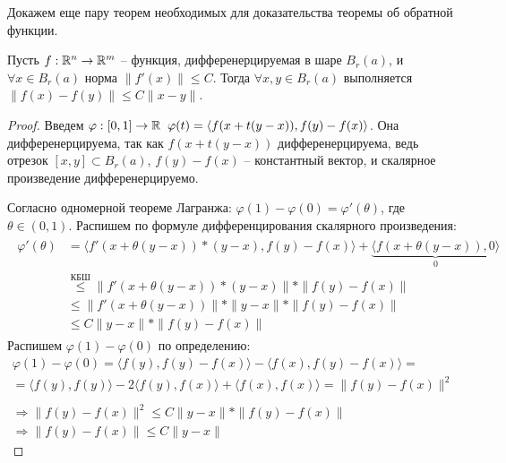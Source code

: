 Докажем еще пару теорем необходимых для доказательства теоремы об обратной функции.
\begin{theorem}
    Пусть $f: \mathbb{R}^n \to \mathbb{R}^m$ -- функция, дифференерцируемая в шаре $B_r(a)$, и $\forall x \in B_r(a)$ норма $\| f'(x) \| \leqslant C$. 
    Тогда $\forall x, y \in B_r(a)$ выполняется $\| f(x) - f(y) \| \leqslant C \| x - y \|$.
\end{theorem}
\begin{proof}
    Введем $\varphi:[0, 1] \to \mathbb{R} \;\; \varphi(t) = \langle f(x + t(y - x)), f(y) - f(x) \rangle$.
    Она дифференерцируема, так как $f(x + t(y - x))$ дифференерцируема, ведь отрезок $[x, y] \subset B_r(a)$, $f(y) - f(x)$ -- константный вектор, и скалярное произведение дифференерцируемо.

    \quad Согласно одномерной теореме Лагранжа: $\varphi(1) - \varphi(0) = \varphi'(\theta)$, где $\theta \in (0, 1)$. 
    Распишем по формуле дифференцирования скалярного произведения: \begin{gather*}
        \begin{split}
            \varphi'(\theta) &= \langle f'(x + \theta(y - x))*(y - x), f(y) - f(x) \rangle + \underbrace{\langle f(x + \theta(y - x)), 0 \rangle}_0  \\
            &\overset{\text{КБШ}}{\leqslant} \| f'(x + \theta(y - x))*(y - x) \| * \| f(y) - f(x) \| \\
            &\leqslant \| f'(x + \theta(y - x))\| * \| y - x \| * \| f(y) - f(x) \| \\
            &\leqslant C\| y - x \| * \| f(y) - f(x) \|
        \end{split}
    \end{gather*}
    \quad Распишем $\varphi(1) - \varphi(0)$ по определению: \begin{gather*}
        \varphi(1) - \varphi(0) = \langle f(y), f(y) - f(x) \rangle - \langle f(x), f(y) - f(x) \rangle = \\
        = \langle f(y), f(y) \rangle - 2 \langle f(y), f(x) \rangle +  \langle f(x), f(x) \rangle = \| f(y) - f(x) \|^2 \\ \\
        \Rightarrow \| f(y) - f(x) \|^2 \leqslant C \| y - x \| * \| f(y) - f(x) \| \\
        \Rightarrow \| f(y) - f(x) \| \leqslant C \| y - x \|
    \end{gather*} 
\end{proof}

